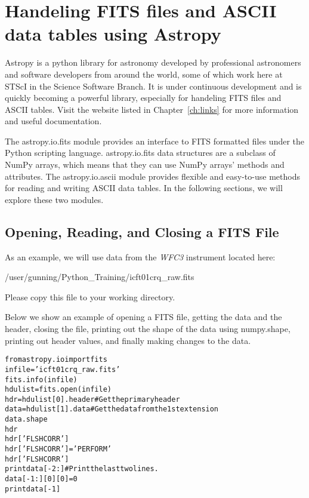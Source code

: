 \chapter{Handeling FITS files and ASCII data tables using Astropy}
\label{ch:fits}
Astropy is a python library for astronomy developed by professional astronomers
and software developers from around the world, some of which work here at STScI
in the Science Software Branch.  It is under continuous development and is quickly
becoming a powerful library, especially for handeling FITS files and ASCII tables.
Visit the website listed in Chapter~\ref{ch:links} for more information and useful
documentation.

The {\sf \small astropy.io.fits} module provides an interface to FITS formatted files under the 
Python scripting language.  {\sf \small astropy.io.fits} data structures are a subclass of NumPy 
arrays, which means that they can use NumPy arrays' methods and attributes.  The
{\sf \small astropy.io.ascii} module provides flexible and easy-to-use methods for reading and 
writing ASCII data tables.  In the following sections, we will explore these two modules.
 
\section{Opening, Reading, and Closing a FITS File}
As an example, we will use data from the \emph{WFC3} instrument located here:

/user/gunning/Python\_Training/icft01crq\_raw.fits

Please copy this file to your working directory. 

Below we show an example of opening a FITS file, getting
the data and the header, closing the file, printing out the shape of
the data using {\sf \small numpy.shape}, printing out header values,
and finally making changes to the data.

\begin{alltt}
\pytab from astropy.io import fits
\pytab infile = 'icft01crq_raw.fits'
\pytab fits.info(infile)
\pytab hdulist = fits.open(infile)
\pytab hdr = hdulist[0].header  # Get the primary header
\pytab data = hdulist[1].data  # Get the data from the 1st extension 
\pytab data.shape
\pytab hdr
\pytab hdr['FLSHCORR'] 
\pytab hdr['FLSHCORR'] = 'PERFORM'
\pytab hdr['FLSHCORR']
\pytab print data[-2:]  # Print the last two lines.
\pytab data[-1:][0][0] = 0
\pytab print data[-1]
\end{alltt}

